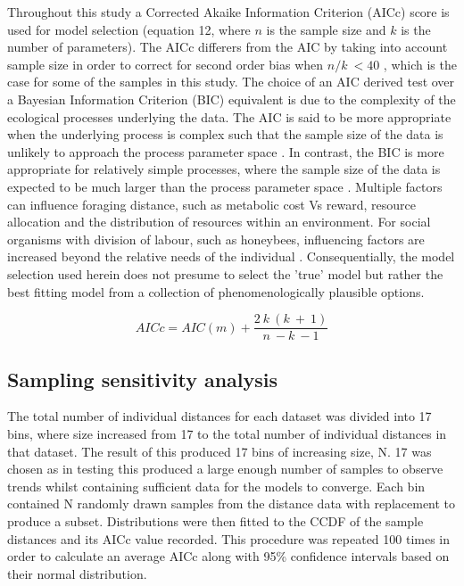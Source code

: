 \documentclass[11pt]{article}
\begin{document}
\begin{linenumbers}
Throughout this study a Corrected Akaike Information Criterion (AICc) score is used for model selection (equation 12, where $n$ is the sample size and $k$ is the number of parameters). The AICc differers from the AIC by taking into account sample size in order to correct for second order bias when $n/k\ < 40$ \citep{Burnham2004}, which is the case for some of the samples in this study. The choice of an AIC derived test over a Bayesian Information Criterion (BIC) equivalent is due to the complexity of the ecological processes underlying the data. The AIC is said to be more appropriate  when the underlying process is complex such that the sample size of the data is unlikely to approach the process parameter space \citep{Aho2014}. In contrast, the BIC is more appropriate for relatively simple processes, where the sample size of the data is expected to be much larger than the process parameter space \citep{Aho2014}. Multiple factors can influence foraging distance, such as metabolic cost Vs reward, resource allocation and the distribution of resources within an environment. For social organisms with division of labour, such as honeybees, influencing factors are increased beyond the relative needs of the individual \citep{Dornhaus2006}. Consequentially, the model selection used herein does not presume to select the 'true' model but rather the best fitting model from a collection of phenomenologically plausible options. 

\begin{equation}
AICc = AIC(m) + \frac{2\ k\ (k\ +\ 1)}{n\ - k\ - 1}
\end{equation}

\subsection{Sampling sensitivity analysis}
The total number of individual distances for each dataset was divided into 17 bins, where size increased from 17 to the total number of individual distances in that dataset. The result of this produced 17 bins of increasing size, N. 17 was chosen as in testing this produced a large enough number of samples to observe trends whilst containing sufficient data for the models to converge. Each bin contained N randomly drawn samples from the distance data with replacement to produce a subset. Distributions were then fitted to the CCDF of the sample distances and its AICc value recorded. This procedure was repeated 100 times in order to calculate an average AICc along with 95\% confidence intervals based on their normal distribution.


\end{linenumbers}
\end{document}
